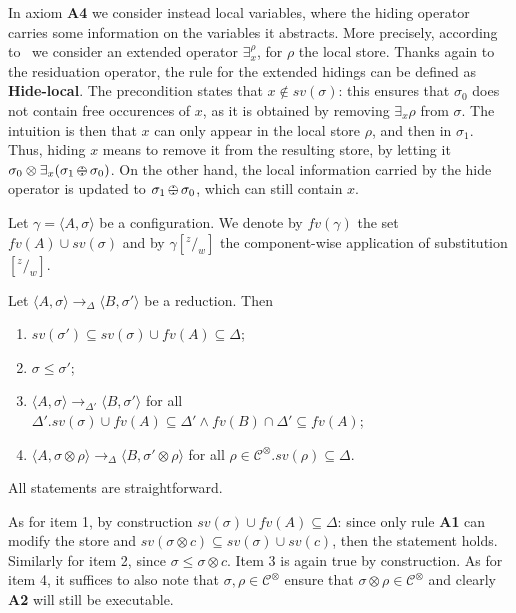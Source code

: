 \documentclass{llncs}
\def\C{{\mathcal C}}
\def\C{{\mathcal C}}
\def\odiv{\, {\ominus\hspace{-7.7pt} \div} \,}
\begin{document}
In axiom {\bf A4} we consider instead local variables, where the hiding operator carries some information on the variables it abstracts.
More precisely, according to~\cite{extendedHiding} we consider an extended operator $\exists_x^\rho$, for $\rho$ the local store.
Thanks again to the residuation operator, the rule for the extended hidings can be defined as {\bf Hide-local}. The precondition states that $x \not \in sv(\sigma)$: this ensures that $\sigma_0$ does not contain free occurences of $x$, as it is obtained by removing $\exists_x \rho$ from $\sigma$. The intuition is then that $x$ can only appear in the local store $\rho$, and then in $\sigma_1$. Thus, hiding $x$ means to remove it from the resulting store, by letting it $\sigma_0 \otimes \exists_x(\sigma_1 \odiv \sigma_0)$. On the other hand, the local information carried by the hide operator is updated to $\sigma_1 \odiv \sigma_0$, which can still contain $x$. \\
\smallskip

Let $\gamma = \langle A, \sigma \rangle$ be a configuration.
%
We denote by $fv(\gamma)$ the set $fv(A) \cup sv(\sigma)$ and by
$\gamma[^z/_w]$ the component-wise application of substitution $[^z/_w]$.

\begin{lemma}[On monotonicity]
\label{mono}
Let $\langle A, \sigma \rangle \rightarrow_\Delta \langle B, \sigma' \rangle$ be a reduction. 
Then
\begin{enumerate}
\item $sv(\sigma') \subseteq sv(\sigma)\cup fv(A) \subseteq \Delta$;
\item $\sigma \leq \sigma'$;
\item $\langle A, \sigma \rangle \rightarrow_{\Delta'} \langle B, \sigma' \rangle$
         for all $\Delta'. sv(\sigma)\cup fv(A) \subseteq \Delta' \wedge fv(B) \cap \Delta' \subseteq fv(A)$;
\item $\langle A, \sigma \otimes \rho \rangle \rightarrow_\Delta \langle B, \sigma' \otimes \rho \rangle$
         for all $\rho \in  \C^\otimes. sv(\rho) \subseteq \Delta$. 
\end{enumerate}
 \end{lemma}
 
 All statements are straightforward. 

As for item 1, by construction $sv(\sigma)\cup fv(A) \subseteq \Delta$: since 
only rule {\bf A1} can modify the store
and $sv(\sigma \otimes c) \subseteq sv(\sigma) \cup sv(c)$, then the statement holds.
Similarly for item 2, since $\sigma \leq \sigma \otimes c$.
Item 3 is again true by construction. 
As for item 4, it suffices to also note that 
$\sigma, \rho \in  \C^\otimes$ ensure that $\sigma \otimes \rho \in  \C^\otimes$
and clearly {\bf A2} will still be executable. 
\end{document}
